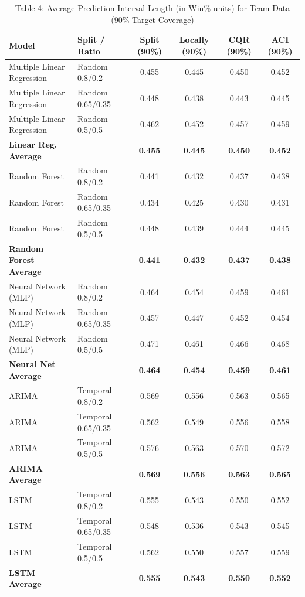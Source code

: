 \documentclass[11pt,a4paper]{article}
\begin{document}
\begin{table}[H]
\centering
\caption{Table 4: Average Prediction Interval Length (in Win\% units) for Team Data (90\% Target Coverage)}
\label{tab:team_tab4}
\scriptsize
\begin{tabular}{llcccc}
\toprule
Model & Split / Ratio & Split (90\%) & Locally (90\%) & CQR (90\%) & ACI (90\%) \\
\midrule
Multiple Linear Regression & Random 0.8/0.2 & 0.455 & 0.445 & 0.450 & 0.452 \\
Multiple Linear Regression & Random 0.65/0.35 & 0.448 & 0.438 & 0.443 & 0.445 \\
Multiple Linear Regression & Random 0.5/0.5 & 0.462 & 0.452 & 0.457 & 0.459 \\
\textbf{Linear Reg. Average} & & \textbf{0.455} & \textbf{0.445} & \textbf{0.450} & \textbf{0.452} \\
\midrule
Random Forest & Random 0.8/0.2 & 0.441 & 0.432 & 0.437 & 0.438 \\
Random Forest & Random 0.65/0.35 & 0.434 & 0.425 & 0.430 & 0.431 \\
Random Forest & Random 0.5/0.5 & 0.448 & 0.439 & 0.444 & 0.445 \\
\textbf{Random Forest Average} & & \textbf{0.441} & \textbf{0.432} & \textbf{0.437} & \textbf{0.438} \\
\midrule
Neural Network (MLP) & Random 0.8/0.2 & 0.464 & 0.454 & 0.459 & 0.461 \\
Neural Network (MLP) & Random 0.65/0.35 & 0.457 & 0.447 & 0.452 & 0.454 \\
Neural Network (MLP) & Random 0.5/0.5 & 0.471 & 0.461 & 0.466 & 0.468 \\
\textbf{Neural Net Average} & & \textbf{0.464} & \textbf{0.454} & \textbf{0.459} & \textbf{0.461} \\
\midrule
ARIMA & Temporal 0.8/0.2 & 0.569 & 0.556 & 0.563 & 0.565 \\
ARIMA & Temporal 0.65/0.35 & 0.562 & 0.549 & 0.556 & 0.558 \\
ARIMA & Temporal 0.5/0.5 & 0.576 & 0.563 & 0.570 & 0.572 \\
\textbf{ARIMA Average} & & \textbf{0.569} & \textbf{0.556} & \textbf{0.563} & \textbf{0.565} \\
\midrule
LSTM & Temporal 0.8/0.2 & 0.555 & 0.543 & 0.550 & 0.552 \\
LSTM & Temporal 0.65/0.35 & 0.548 & 0.536 & 0.543 & 0.545 \\
LSTM & Temporal 0.5/0.5 & 0.562 & 0.550 & 0.557 & 0.559 \\
\textbf{LSTM Average} & & \textbf{0.555} & \textbf{0.543} & \textbf{0.550} & \textbf{0.552} \\
\bottomrule
\end{tabular}
\end{table}
\end{document}
